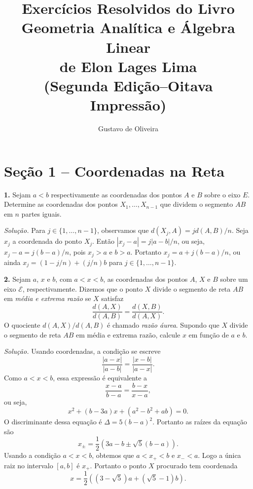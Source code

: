 \documentclass[a4paper,11pt]{article}
\title{Exercícios Resolvidos do Livro\\Geometria Analítica e Álgebra Linear\\de Elon Lages Lima\\(Segunda Edição--Oitava Impressão)}
\author{Gustavo de Oliveira}
\begin{document}
\maketitle

\section*{Seção 1 -- Coordenadas na Reta}

\textbf{1.}
Sejam $a < b$ respectivamente as coordenadas dos pontos $A$ e $B$ sobre o eixo $E$.
Determine as coordenadas dos pontos $X_1, \dots, X_{n-1}$ que dividem o segmento $AB$ em $n$ partes iguais.

\vspace{\baselineskip}

\emph{Solução.}
Para $j \in \{1, \dots, n-1 \}$, observamos que $d(X_j,A) = j d(A,B)/n$.
Seja $x_j$ a coordenada do ponto $X_j$.
Então $|x_j - a| = j|a-b|/n$, ou seja, $x_j - a = j(b-a)/n$, pois $x_j > a$ e $b > a$.
Portanto $x_j = a + j(b-a)/n$, ou ainda $x_j = (1-j/n) + (j/n)b$ para $j \in \{1, \dots, n-1 \}$.

\vspace{\baselineskip}

\textbf{2.}
Sejam $a$, $x$ e $b$, com $a < x < b$, as coordenadas dos pontos $A$, $X$ e $B$ sobre um eixo $\mathcal{E}$, respectivamente.
Dizemos que o ponto $X$ divide o segmento de reta $AB$ em \emph{média e extrema razão} se $X$ satisfaz
\[
  \frac{d(A,X)}{d(A,B)} = \frac{d(X,B)}{d(A,X)}.
\]
O quociente $d(A,X)/d(A,B)$ é chamado \emph{razão áurea}.
Supondo que $X$ divide o segmento de reta $AB$ em média e extrema razão, calcule $x$ em função de $a$ e $b$.

\vspace{\baselineskip}

\emph{Solução.}
Usando coordenadas, a condição se escreve
\[
  \frac{|a-x|}{|a-b|} = \frac{|x-b|}{|a-x|}.
\]
Como $a < x < b$, essa expressão é equivalente a
\[
  \frac{x-a}{b-a} = \frac{b-x}{x-a},
\]
ou seja,
\[
  x^2 + (b-3a) x + (a^2-b^2+ab) = 0.
\]
O discriminante dessa equação é $\Delta = 5(b-a)^2$.
Portanto as raízes da equação são
\[
  x_{\pm} = \frac{1}{2} (3a - b \pm \sqrt{5}(b-a)).
\]
Usando a condição $a < x < b$, obtemos que $a < x_+ < b$ e $x_- < a$.
Logo a única raiz no intervalo $[a,b]$ é $x_+$.
Portanto o ponto $X$ procurado tem coordenada
\[
  x = \frac{1}{2} ( (3-\sqrt{5}) a + (\sqrt{5}-1) b ).
\]

\vspace{\baselineskip}
\end{document}
